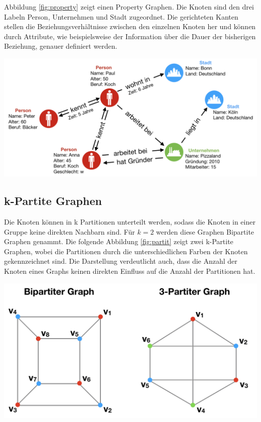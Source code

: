 Abbildung \ref{fig:property} zeigt einen Property Graphen.
Die Knoten sind den drei Labeln Person, Unternehmen und Stadt zugeordnet.
Die gerichteten Kanten stellen die Beziehungsverhältnisse zwischen den einzelnen Knoten her und können durch Attribute, wie beispielsweise der Information über die Dauer der bisherigen Beziehung, genauer definiert werden.
\begin{center}
	\includegraphics[scale = 0.65]{./images/Property_graph.png}
	\label{fig:property}
\end{center}
\subsection{k-Partite Graphen}
Die Knoten können in k Partitionen unterteilt werden, sodass die Knoten in einer Gruppe keine direkten Nachbarn sind.
Für $k=2$ werden diese Graphen Bipartite Graphen genammt.
Die folgende Abbildung \ref{fig:partit} zeigt zwei k-Partite Graphen, wobei die Partitionen durch die unterschiedlichen Farben der Knoten gekennzeichnet sind.
Die Darstellung verdeutlicht auch, dass die Anzahl der Knoten eines Graphs keinen direkten Einfluss auf die Anzahl der Partitionen hat.
\begin{center}
	\includegraphics[scale = 0.4]{./images/k_partiter_graph.png}
	\label{fig:partit}
\end{center}
